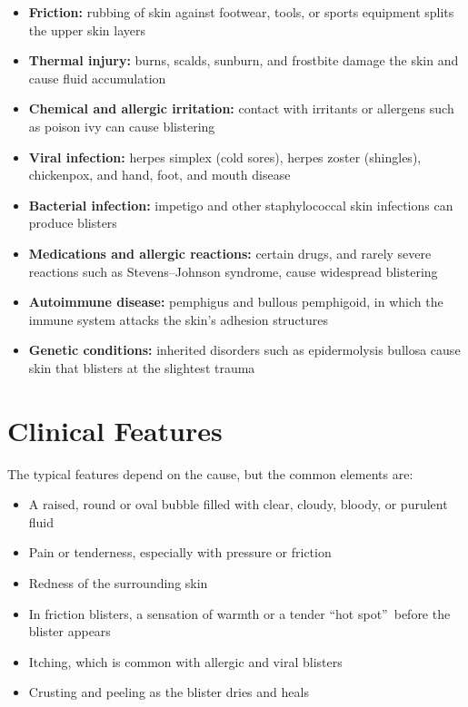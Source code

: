 \begin{itemize}
    \item \textbf{Friction:} rubbing of skin against footwear, tools, or sports equipment splits the upper skin layers
    \item \textbf{Thermal injury:} burns, scalds, sunburn, and frostbite damage the skin and cause fluid accumulation
    \item \textbf{Chemical and allergic irritation:} contact with irritants or allergens such as poison ivy can cause blistering
    \item \textbf{Viral infection:} herpes simplex (cold sores), herpes zoster (shingles), chickenpox, and hand, foot, and mouth disease
    \item \textbf{Bacterial infection:} impetigo and other staphylococcal skin infections can produce blisters
    \item \textbf{Medications and allergic reactions:} certain drugs, and rarely severe reactions such as Stevens--Johnson syndrome, cause widespread blistering
    \item \textbf{Autoimmune disease:} pemphigus and bullous pemphigoid, in which the immune system attacks the skin's adhesion structures
    \item \textbf{Genetic conditions:} inherited disorders such as epidermolysis bullosa cause skin that blisters at the slightest trauma
\end{itemize}

\section*{Clinical Features}
The typical features depend on the cause, but the common elements are:

\begin{itemize}
    \item A raised, round or oval bubble filled with clear, cloudy, bloody, or purulent fluid
    \item Pain or tenderness, especially with pressure or friction
    \item Redness of the surrounding skin
    \item In friction blisters, a sensation of warmth or a tender \textquotedblleft hot spot\textquotedblright\ before the blister appears
    \item Itching, which is common with allergic and viral blisters
    \item Crusting and peeling as the blister dries and heals
\end{itemize}

